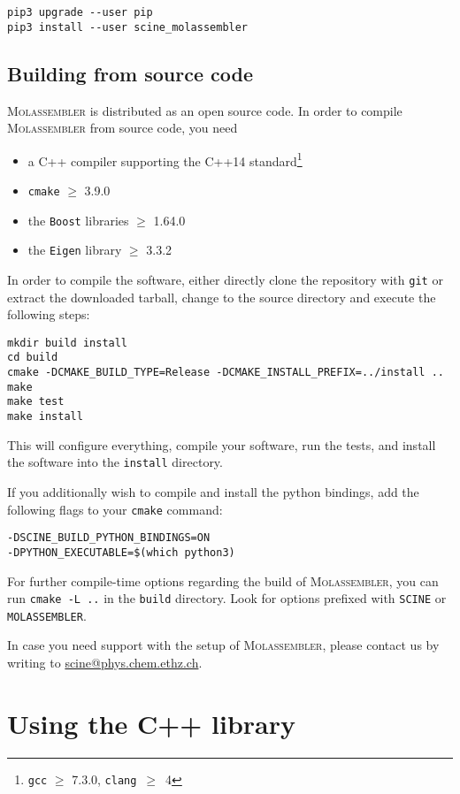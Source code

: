 \documentclass[]{tufte-book}
\begin{document}
\begin{Verbatim}
pip3 upgrade --user pip
pip3 install --user scine_molassembler
\end{Verbatim}

\section{Building from source code}

\textsc{Molassembler} is distributed as an open source code. In order to compile
\textsc{Molassembler} from source code, you need
\begin{itemize}
  \item a C++ compiler supporting the C++14 standard\footnote{\texttt{gcc} $\ge$
    7.3.0, \texttt{clang}~$\ge$~4}
  \item \texttt{cmake} $\ge$ 3.9.0
  \item the \texttt{Boost} libraries $\ge$ 1.64.0
  \item the \texttt{Eigen} library $\ge$ 3.3.2
\end{itemize}
In order to compile the software, either directly clone the repository with
\texttt{git} or extract the downloaded tarball, change to the source directory
and execute the following steps:
\begin{Verbatim}
mkdir build install
cd build
cmake -DCMAKE_BUILD_TYPE=Release -DCMAKE_INSTALL_PREFIX=../install ..
make
make test
make install
\end{Verbatim}

This will configure everything, compile your software, run the tests, and
install the software into the \texttt{install} directory.

If you additionally wish to compile and install the python bindings, add the
following flags to your \texttt{cmake} command:

\begin{Verbatim}
-DSCINE_BUILD_PYTHON_BINDINGS=ON
-DPYTHON_EXECUTABLE=$(which python3)
\end{Verbatim}

For further compile-time options regarding the build of \textsc{Molassembler},
you can run \texttt{cmake -L ..} in the \texttt{build} directory. Look for
options prefixed with \texttt{SCINE} or \texttt{MOLASSEMBLER}.

In case you need support with the setup of \textsc{Molassembler}, please contact us by writing to \href{scine@phys.chem.ethz.ch}{scine@phys.chem.ethz.ch}.


\chapter{Using the C++ library}
\end{document}
